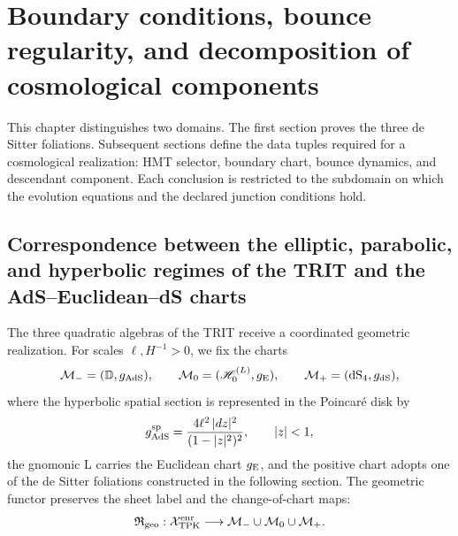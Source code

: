 
\section{Boundary conditions, bounce regularity, and decomposition of cosmological components}
\label{chap:cosmologia-frontera-rebote}

This chapter distinguishes two domains. The first section proves the three
de Sitter foliations. Subsequent sections define the data tuples required for
a cosmological realization: HMT selector, boundary chart, bounce dynamics,
and descendant component. Each conclusion is restricted to the subdomain on
which the evolution equations and the declared junction conditions hold.

\subsection{Correspondence between the elliptic, parabolic, and hyperbolic regimes of the TRIT and the AdS--Euclidean--dS charts}
\label{sec:atlas-ads-euclideo-ds-hmt}

The three quadratic algebras of the TRIT receive a coordinated geometric
realization. For scales \(\ell,H^{-1}>0\), we fix the charts
\[
 \mathcal M_-=(\mathbb D, g_{\rm AdS}),
 \qquad
 \mathcal M_0=(\mathscr H_0^{(L)},g_{\rm E}),
 \qquad
 \mathcal M_+=(\mathrm{dS}_4,g_{\rm dS}),
\]
where the hyperbolic spatial section is represented in the Poincaré disk
by
\[
 g_{\rm AdS}^{\rm sp}
 =\frac{4\ell^2\,|dz|^2}{(1-|z|^2)^2},
 \qquad |z|<1,
\]
the gnomonic L carries the Euclidean chart \(g_{\rm E}\), and the positive chart
adopts one of the de Sitter foliations constructed in the following
section. The geometric functor preserves the sheet label and the change-of-chart
maps:
\[
 \mathfrak R_{\rm geo}:\mathcal X_{\rm TPK}^{\rm enr}
 \longrightarrow
 \mathcal M_-\cup\mathcal M_0\cup\mathcal M_+.
\]

